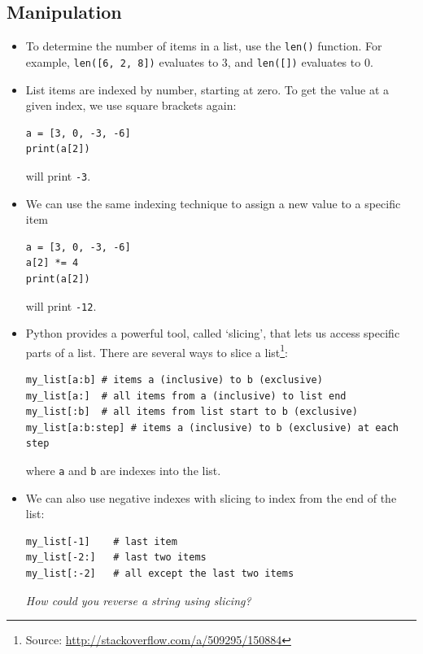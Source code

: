 \documentclass[a4paper,twoside,titlepage]{memoir}
\newcommand{\shellcmd}{\texttt}
\begin{document}
\subsection{Manipulation}
\begin{itemize}
\item To determine the number of items in a list, use the \shellcmd{len()} function.  For example, \shellcmd{len([6, 2, 8])} evaluates to 3, and \shellcmd{len([])} evaluates to 0.
\item List items are indexed by number, starting at zero.  To get the value at a given index, we use square brackets again:
\begin{verbatim}
a = [3, 0, -3, -6]
print(a[2])
\end{verbatim}
will print \shellcmd{-3}.

\item We can use the same indexing technique to assign a new value to a specific item
\begin{verbatim}
a = [3, 0, -3, -6]
a[2] *= 4
print(a[2])
\end{verbatim}
will print \shellcmd{-12}.

\item Python provides a powerful tool, called `slicing', that lets us access specific parts of a list.  There are several ways to slice a list\footnote{Source: \url{http://stackoverflow.com/a/509295/150884}}:
\begin{verbatim}
my_list[a:b] # items a (inclusive) to b (exclusive)
my_list[a:]  # all items from a (inclusive) to list end
my_list[:b]  # all items from list start to b (exclusive)
my_list[a:b:step] # items a (inclusive) to b (exclusive) at each step
\end{verbatim}
where \shellcmd{a} and \shellcmd{b} are indexes into the list.
\item We can also use negative indexes with slicing to index from the end of the list:
\begin{verbatim}
my_list[-1]    # last item
my_list[-2:]   # last two items
my_list[:-2]   # all except the last two items
\end{verbatim}
\textit{How could you reverse a string using slicing?}


\end{itemize}
\end{document}
